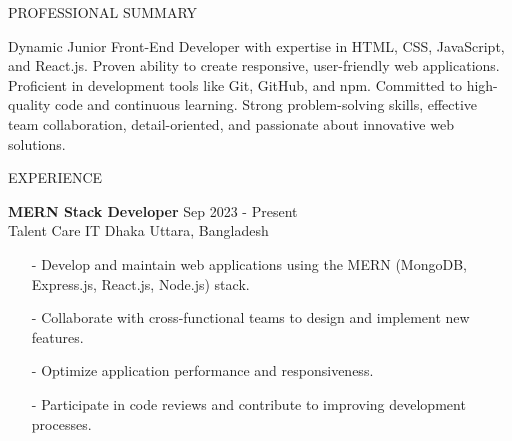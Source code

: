 \documentclass{resume} %
\begin{document}

\begin{rSection}{PROFESSIONAL SUMMARY}

{Dynamic Junior Front-End Developer with expertise in HTML, CSS, JavaScript, and React.js. Proven ability to create responsive, user-friendly web applications. Proficient in development tools like Git, GitHub, and npm. Committed to high-quality code and continuous learning. Strong problem-solving skills, effective team collaboration, detail-oriented, and passionate about innovative web solutions.}

\end{rSection}


\begin{rSection}{EXPERIENCE}

\textbf{MERN Stack Developer} \hfill Sep 2023 - Present\\
Talent Care IT \hfill Dhaka Uttara, Bangladesh
\begin{itemize}
    \item[-] Develop and maintain web applications using the MERN (MongoDB, Express.js, React.js, Node.js) stack.
    \item[-] Collaborate with cross-functional teams to design and implement new features.
    \item[-] Optimize application performance and responsiveness.
    \item[-] Participate in code reviews and contribute to improving development processes.
\end{itemize}

\end{rSection}
\end{document}
